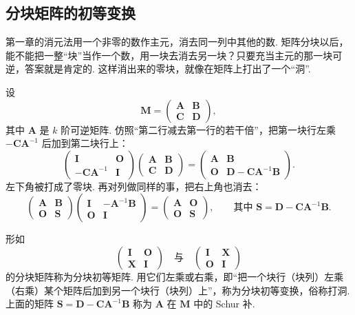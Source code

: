 \documentclass[lang=cn,10.5pt,scheme=chinese,toc=twocol,section,chinesefont=nofont,
twoside,citestyle=gb7714-2015,bibstyle=gb7714-2015]{elegantbook}
\DeclareRobustCommand{\textbf}[1]{{\lnsemiboldlatin\lnsemiboldcjk #1}}
\newcommand{\vv}[1]{\boldsymbol{#1}}
\numberwithin{equation}{section}   %
\begin{document}
\subsection{分块矩阵的初等变换}\label{subsec:holepunch}

\begin{motivebox}
  第一章的消元法用一个非零的数作主元，消去同一列中其他的数. 矩阵分块以后，能不能把一整“块”当作一个数，用一块去消去另一块？只要充当主元的那一块\textbf{可逆}，答案就是肯定的. 这样消出来的零块，就像在矩阵上打出了一个“洞”.
\end{motivebox}

设
\[
  \vv M=
  \begin{pmatrix}
    \vv A & \vv B \\ \vv C&\vv D
  \end{pmatrix}
  ,
\]
其中 $\vv A$ 是 $k$ 阶\textbf{可逆}矩阵. 仿照“第二行减去第一行的若干倍”，把第一块行左乘 $-\vv C\vv A^{-1}$ 后加到第二块行上：
\[
  \begin{pmatrix}
    \vv I & \vv O \\ -\vv C\vv A^{-1}&\vv I
  \end{pmatrix}
  \begin{pmatrix}
    \vv A & \vv B \\ \vv C&\vv D
  \end{pmatrix}
  =
  \begin{pmatrix}
    \vv A & \vv B \\ \vv O&\vv D-\vv C\vv A^{-1}\vv B
  \end{pmatrix}
  .
\]
左下角被打成了零块. 再对列做同样的事，把右上角也消去：
\[
  \begin{pmatrix}
    \vv A & \vv B \\ \vv O&\vv S
  \end{pmatrix}
  \begin{pmatrix}
    \vv I & -\vv A^{-1}\vv B \\ \vv O&\vv I
  \end{pmatrix}
  =
  \begin{pmatrix}
    \vv A & \vv O \\ \vv O&\vv S
  \end{pmatrix}
  ,
  \qquad\text{其中 }\vv S=\vv D-\vv C\vv A^{-1}\vv B.
\]

\begin{definition}
  形如
  \[
    \begin{pmatrix}
      \vv I & \vv O \\ \vv X&\vv I
    \end{pmatrix}
    \quad\text{与}\quad
    \begin{pmatrix}
      \vv I & \vv X \\ \vv O&\vv I
    \end{pmatrix}
  \]
  的分块矩阵称为\textbf{分块初等矩阵}. 用它们左乘或右乘，即“把一个块行（块列）左乘（右乘）某个矩阵后加到另一个块行（块列）上”，称为\textbf{分块初等变换}，俗称\textbf{打洞}. 上面的矩阵 $\vv S=\vv D-\vv C\vv A^{-1}\vv B$ 称为 $\vv A$ 在 $\vv M$ 中的 \textbf{Schur 补}.
\end{definition}
\end{document}
